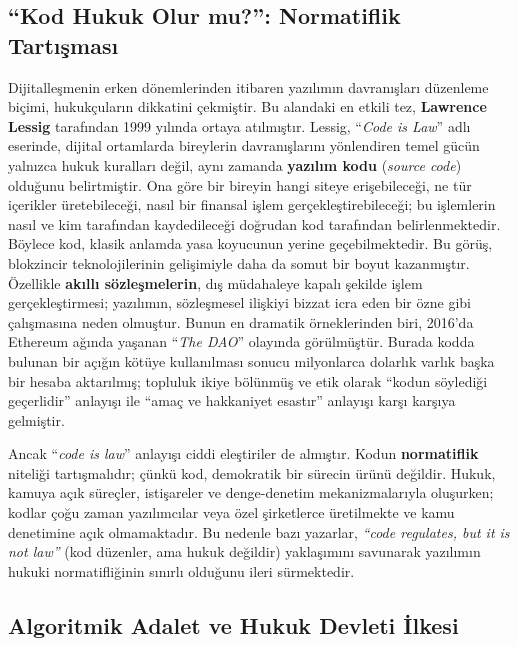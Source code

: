 \documentclass[a4paper,12pt]{article}
\begin{document}
\subsection{“Kod Hukuk Olur mu?”: Normatiflik Tartışması}

Dijitalleşmenin erken dönemlerinden itibaren yazılımın davranışları düzenleme biçimi, hukukçuların dikkatini çekmiştir. Bu alandaki en etkili tez, \textbf{Lawrence Lessig} tarafından 1999 yılında ortaya atılmıştır. Lessig, “\textit{Code is Law}” adlı eserinde, dijital ortamlarda bireylerin davranışlarını yönlendiren temel gücün yalnızca hukuk kuralları değil, aynı zamanda \textbf{yazılım kodu} (\textit{source code}) olduğunu belirtmiştir. Ona göre bir bireyin hangi siteye erişebileceği, ne tür içerikler üretebileceği, nasıl bir finansal işlem gerçekleştirebileceği; bu işlemlerin nasıl ve kim tarafından kaydedileceği doğrudan kod tarafından belirlenmektedir. Böylece kod, klasik anlamda yasa koyucunun yerine geçebilmektedir. Bu görüş, blokzincir teknolojilerinin gelişimiyle daha da somut bir boyut kazanmıştır. Özellikle \textbf{akıllı sözleşmelerin}, dış müdahaleye kapalı şekilde işlem gerçekleştirmesi; yazılımın, sözleşmesel ilişkiyi bizzat icra eden bir özne gibi çalışmasına neden olmuştur. Bunun en dramatik örneklerinden biri, 2016’da Ethereum ağında yaşanan “\textit{The DAO}” olayında görülmüştür. Burada kodda bulunan bir açığın kötüye kullanılması sonucu milyonlarca dolarlık varlık başka bir hesaba aktarılmış; topluluk ikiye bölünmüş ve etik olarak “kodun söylediği geçerlidir” anlayışı ile “amaç ve hakkaniyet esastır” anlayışı karşı karşıya gelmiştir.

Ancak “\textit{code is law}” anlayışı ciddi eleştiriler de almıştır. Kodun \textbf{normatiflik} niteliği tartışmalıdır; çünkü kod, demokratik bir sürecin ürünü değildir. Hukuk, kamuya açık süreçler, istişareler ve denge-denetim mekanizmalarıyla oluşurken; kodlar çoğu zaman yazılımcılar veya özel şirketlerce üretilmekte ve kamu denetimine açık olmamaktadır. Bu nedenle bazı yazarlar, \textit{“code regulates, but it is not law”} (kod düzenler, ama hukuk değildir) yaklaşımını savunarak yazılımın hukuki normatifliğinin sınırlı olduğunu ileri sürmektedir.

\subsection{Algoritmik Adalet ve Hukuk Devleti İlkesi}
\end{document}
